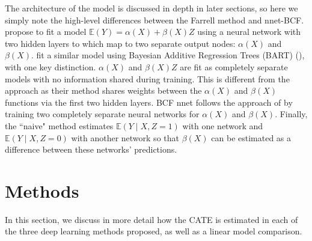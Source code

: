 \documentclass[11pt,  dvipsnames, table, x11name]{article}
\newcommand\E[1]{\mathbb{E}\left(#1\right)}
\begin{document}
	The architecture of the model is discussed in depth in later sections, so here we simply note the high-level 
	differences between the Farrell method and nnet-BCF. \cite{farrell2020deep} propose to fit a model 
	$\E{Y} = \alpha\left(X\right) + \beta\left(X\right) Z$ using a neural network with two hidden layers to which map to two 
	separate output nodes: $\alpha\left(X\right)$ and $\beta\left(X\right)$. 
	\cite{hahn2020bayesian} fit a similar model using Bayesian Additive Regression Trees (BART) (\cite{chipman2010bart}), 
	with one key distinction. $\alpha\left(X\right)$ and $\beta\left(X\right) Z$ are fit as completely separate models with no information 
	shared during training. This is different from the \cite{farrell2020deep} approach as their method shares weights between 
	the $\alpha(X)$ and $\beta(X)$ functions via the first two hidden layers. BCF nnet follows the approach of 
	\cite{hahn2020bayesian} by training two completely separate neural networks for $\alpha(X)$ and $\beta(X)$. 
	Finally, the ``naive" method estimates $\E{Y \mid X, Z = 1}$ with one network and $\E{Y \mid X, Z = 0}$ 
	with another network so that $\beta(X)$ can be estimated as a difference between these networks' predictions.
	
	\section{Methods}
	In this section, we discuss in more detail how the CATE is estimated in each of the three deep learning methods proposed, as well as a linear model comparison.
\end{document}

